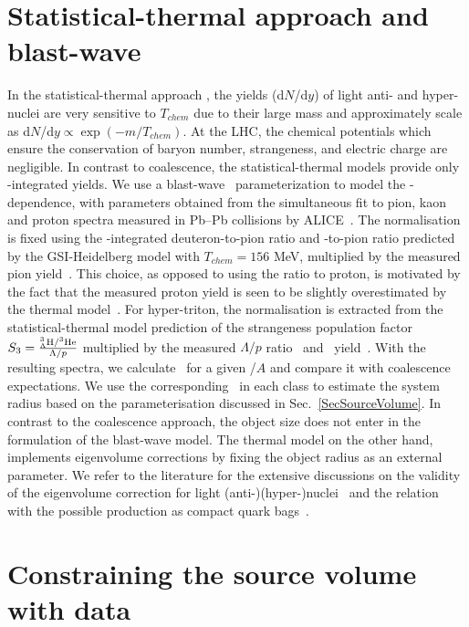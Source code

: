 \section{Statistical-thermal approach and blast-wave}\label{sec:thermal}
In the statistical-thermal approach \cite{Petran:2013dva,Wheaton:2004qb,Andronic:2005yp}, the yields (d$N$/d$y$) of light anti- and hyper-nuclei are very sensitive to $T_{chem}$ due to their large mass and approximately scale as d$N$/d$y \propto \exp(-m/T_{chem})$. 
At the LHC, the chemical potentials which ensure the conservation of baryon number, strangeness, and electric charge are negligible.
In contrast to coalescence, the statistical-thermal models provide only \pt-integrated yields. 
We use a blast-wave~\cite{Schnedermann:1993ws} parameterization to model the \pt-dependence, with parameters obtained from the simultaneous fit to pion, kaon and proton spectra measured in Pb--Pb collisions by ALICE~\cite{Abelev:2013vea}. 
The normalisation is fixed using the \pt-integrated deuteron-to-pion ratio and \hethree-to-pion ratio predicted by the GSI-Heidelberg model with $T_{chem} = 156$ MeV, multiplied by the measured pion yield~\cite{Abelev:2013vea}. 
This choice, as opposed to using the ratio to proton, is motivated by the fact that the measured proton yield is seen to be slightly overestimated by the thermal model~\cite{Abelev:2012wca}.
For hyper-triton, the normalisation is extracted from the statistical-thermal model prediction of the strangeness population factor $S_{3} = { _{\Lambda}^{3}\mathrm{H} / ^{3}{\mathrm{He}} \over \Lambda/p}$ multiplied by the measured $\Lambda/p$ ratio~\cite{Abelev:2013vea,Abelev:2013xaa} and \hethree~yield~\cite{ALICE:deuteronppPbPb2015}. 
With the resulting spectra, we calculate \bA~for a given \pt/$A$ and compare it with coalescence expectations. 
We use the corresponding \avdNdeta~in each class to estimate the system radius based on the parameterisation discussed in Sec.~\ref{SecSourceVolume}. 
In contrast to the coalescence approach, the object size does not enter in the formulation of the blast-wave model.
The thermal model on the other hand, implements eigenvolume corrections by fixing the object radius as an external parameter.
We refer to the literature for the extensive discussions on the validity of the eigenvolume correction for light \mbox{(anti-)(hyper-)}nuclei~\cite{Vovchenko:2016mwg} and the relation with the possible production as compact quark bags~\cite{Andronic:2017}.

\section{Constraining the source volume with data}\label{sec:radiiParamet}

